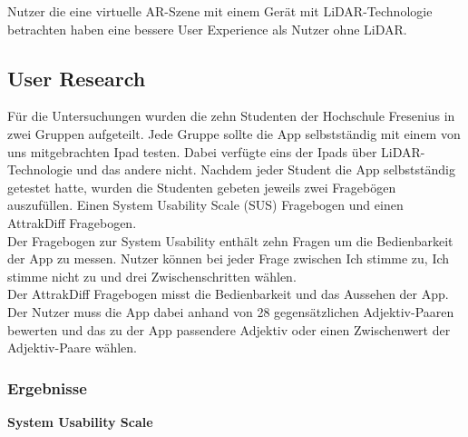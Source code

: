 \documentclass[titlepage, a4paper, 11pt]{scrartcl}
\begin{document}
    \glqq Nutzer die eine virtuelle AR-Szene mit einem Gerät mit LiDAR-Technologie betrachten haben eine bessere User Experience als Nutzer ohne LiDAR. \grqq{}

  \subsection{User Research}
    Für die Untersuchungen wurden die zehn Studenten der Hochschule Fresenius in zwei Gruppen aufgeteilt. 
    Jede Gruppe sollte die App selbstständig mit einem von uns mitgebrachten Ipad testen. 
    Dabei verfügte eins der Ipads über LiDAR-Technologie und das andere nicht. 
    Nachdem jeder Student die App selbstständig getestet hatte, wurden die Studenten gebeten jeweils zwei Fragebögen auszufüllen. 
    Einen System Usability Scale (SUS) \cite{SUS} Fragebogen und einen AttrakDiff \cite{AttrakDiff} Fragebogen.\\ 
    Der Fragebogen zur System Usability enthält zehn Fragen um die Bedienbarkeit der App zu messen. 
    Nutzer können bei jeder Frage zwischen \glqq Ich stimme zu\grqq, \glqq Ich stimme nicht zu\grqq{} und drei Zwischenschritten wählen.\\ 
    Der AttrakDiff Fragebogen misst die Bedienbarkeit und das Aussehen der App. 
    Der Nutzer muss die App dabei anhand von 28 gegensätzlichen Adjektiv-Paaren bewerten und das zu der App passendere Adjektiv oder einen Zwischenwert der Adjektiv-Paare wählen.

    \subsubsection{Ergebnisse}
      \textbf{System Usability Scale}\\

\end{document}
